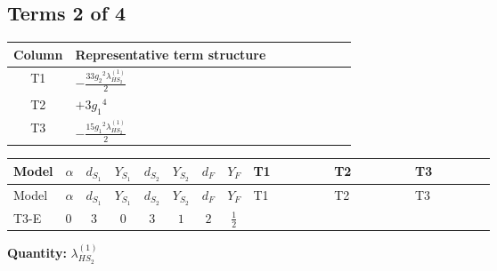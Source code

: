 \documentclass[8pt]{article}
\begin{document}
\begin{landscape}
\subsection*{Terms 2 of 4}
\begin{center}
\begin{tabular}{@{}c >{\raggedright\arraybackslash}p{0.82\linewidth}@{}}
\toprule
Column & Representative term structure \\
\midrule
T1 & \(\displaystyle -\frac{33 {g_2}^2 {\lambda_{HS_2}^{(1)}}}{2}\) \\
\midrule
T2 & \(\displaystyle +3 {g_1}^4\) \\
\midrule
T3 & \(\displaystyle -\frac{15 {g_1}^2 {\lambda_{HS_2}^{(1)}}}{2}\) \\
\midrule
\bottomrule
\end{tabular}
\end{center}
\smallskip
\tiny
\begin{longtable}{@{}llcccccc >{\raggedright\arraybackslash}p{0.21\linewidth} >{\raggedright\arraybackslash}p{0.21\linewidth} >{\raggedright\arraybackslash}p{0.21\linewidth}@{}}
\toprule
Model & $\alpha$ & $d_{S_1}$ & $Y_{S_1}$ & $d_{S_2}$ & $Y_{S_2}$ & $d_F$ & $Y_F$ & T1 & T2 & T3 \\
\midrule
\endfirsthead
\toprule
Model & $\alpha$ & $d_{S_1}$ & $Y_{S_1}$ & $d_{S_2}$ & $Y_{S_2}$ & $d_F$ & $Y_F$ & T1 & T2 & T3 \\
\midrule
\endhead
T3-E & $0$ & $3$ & $0$ & $3$ & $1$ & $2$ & $\frac{1}{2}$ & \scriptsize\adjustbox{max width=\linewidth}{$\begin{gathered} -\frac{33 {g_2}^2 {\lambda_{HS_2}^{(1)}}}{2}\end{gathered}$} & \scriptsize\adjustbox{max width=\linewidth}{$\begin{gathered} +3 {g_1}^4\end{gathered}$} & \scriptsize\adjustbox{max width=\linewidth}{$\begin{gathered} -\frac{15 {g_1}^2 {\lambda_{HS_2}^{(1)}}}{2}\end{gathered}$} \\
\midrule
\bottomrule
\end{longtable}
\clearpage
\noindent\textbf{Quantity: }$\lambda_{HS_2}^{(1)}$\par\smallskip

\end{landscape}
\end{document}
